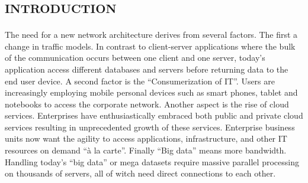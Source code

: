 %
\section*{\small \textsc{introduction}}
The need for a new network architecture derives from several factors. The first a change in traffic models. In contrast to client-server applications where the bulk of the communication occurs between one client and one server, today's application access different databases and servers before returning data to the end user device. A second factor is the ``Consumerization of \ac{IT}''. Users are increasingly employing mobile personal devices such as smart phones, tablet and notebooks to access the corporate network. Another aspect is the rise of cloud services. Enterprises have enthusiastically embraced both public and private cloud services resulting in unprecedented growth of these services. Enterprise business units now want the agility to access applications, infrastructure, and other \ac{IT} resources on demand ``à la carte''. Finally ``Big data'' means more bandwidth. Handling today's ``big data'' or mega datasets require massive parallel processing on thousands of servers, all of witch need direct connections to each other. \cite{onf:sdn-description-need}

